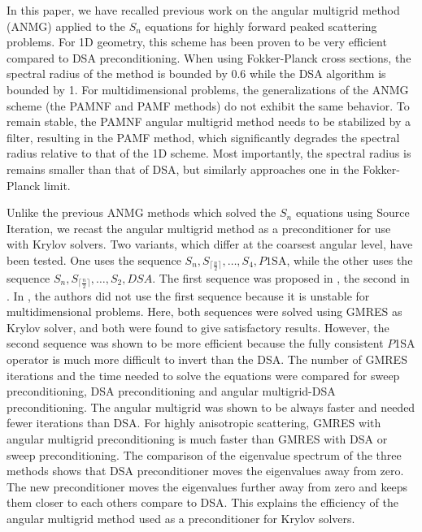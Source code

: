 \documentclass[preprint,10pt]{elsarticle}
\renewcommand{\(}{\left(}
\renewcommand{\)}{\right)}
\renewcommand{\[}{\left[}
\renewcommand{\]}{\right]}
\begin{document}
In this paper, we have recalled previous work on the angular multigrid
method (ANMG) applied to the $S_n$ equations for highly forward peaked scattering problems. 
For 1D geometry, this scheme has been proven to be very 
efficient compared to DSA preconditioning. When using Fokker-Planck cross sections, the
spectral radius of the method is bounded by 0.6 while the DSA algorithm is bounded by 1. 
For multidimensional problems, the generalizations of the ANMG scheme (the
PAMNF and PAMF methods) do not exhibit the same behavior. To remain stable, the PAMNF angular 
multigrid method needs to be stabilized by a filter, resulting in the PAMF method, which 
significantly degrades the spectral radius relative to that of the 1D scheme. Most 
importantly, the spectral radius is remains smaller than that of DSA, but similarly approaches one 
in the Fokker-Planck limit. 

Unlike the previous ANMG methods which solved the $S_n$ equations using Source 
Iteration, we recast the angular multigrid method as a preconditioner for use with Krylov solvers. 
Two variants, which differ at the coarsest angular level, have been tested. One uses the sequence 
$S_n,S_{\lceil\frac{n}{2}\rceil}, \hdots,S_4,P1\text{SA}$, while the other uses the sequence $S_n,
S_{\lceil\frac{n}{2}\rceil},\hdots,S_2,DSA$.  The first sequence was proposed in \cite{multigrid_1d}, 
the second in \cite{multigrid_2d}. In \cite{multigrid_2d}, the authors did not use the first
sequence because it is unstable for multidimensional problems. Here, both sequences were solved using 
GMRES as Krylov solver, and both were found to give satisfactory results.  However, the second sequence 
was shown to be more efficient because the fully consistent $P$1SA operator is much more difficult to invert 
than the DSA. The number of GMRES iterations and the time needed
to solve the equations were compared for sweep preconditioning, DSA
preconditioning and angular multigrid-DSA preconditioning. The angular
multigrid was shown to be always faster and needed fewer iterations than DSA.
For highly anisotropic scattering, GMRES with angular multigrid
preconditioning is much faster than GMRES with DSA or sweep preconditioning.
The comparison of the eigenvalue spectrum of the three methods shows that 
DSA preconditioner moves the eigenvalues away from zero. The new
preconditioner moves the eigenvalues further away from zero and keeps them
closer to each others compare to DSA. This explains the
efficiency of the angular multigrid method used as a preconditioner for Krylov solvers.
\end{document}

